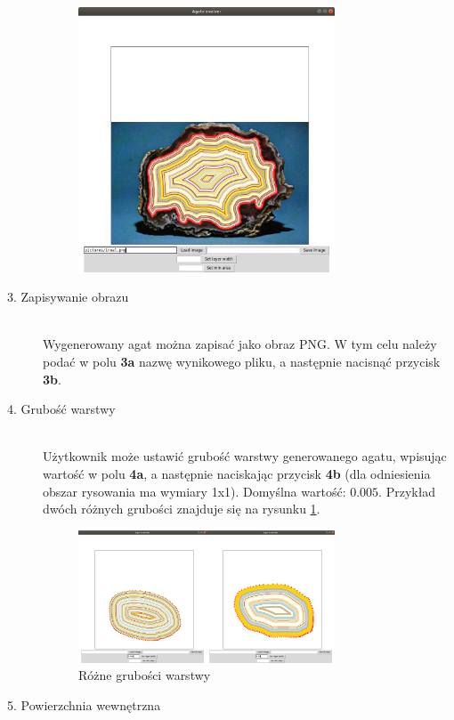 \documentclass{article}
\begin{document}
\begin{description}
\begin{figure}[H]
\includegraphics[width=0.75\textwidth]{obrazy/agat_wygenerowany_na_rysunku.png}
\end{figure}
\item[3. Zapisywanie obrazu] \hfill \\
Wygenerowany agat można zapisać jako obraz PNG. W tym celu należy podać w polu \textbf{3a} nazwę wynikowego pliku, a następnie nacisnąć przycisk \textbf{3b}.
\item[4. Grubość warstwy] \hfill \\
Użytkownik może ustawić grubość warstwy generowanego agatu, wpisując wartość w polu \textbf{4a}, a następnie naciskając przycisk \textbf{4b} (dla odniesienia obszar rysowania ma wymiary 1x1). Domyślna wartość: $0.005$. Przykład dwóch różnych grubości znajduje się na rysunku \ref{rozne_grubosci_warstwy}.
\begin{figure}[H]
\caption{Różne grubości warstwy}
\label{rozne_grubosci_warstwy}
\centering
\includegraphics[width=0.75\textwidth]{obrazy/rozne_grubosci_warstwy.png}
\end{figure}
\item[5. Powierzchnia wewnętrzna] \hfill \\

\end{description}
\end{document}
